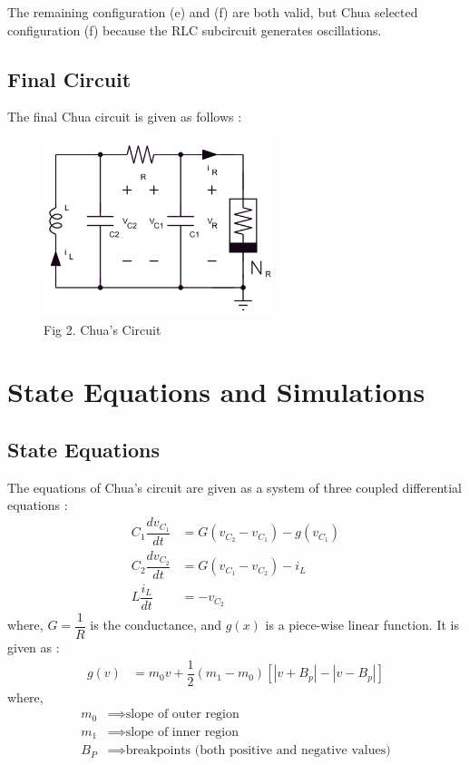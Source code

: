 \documentclass[12pt]{article}
\begin{document}
The remaining configuration (e) and (f) are both valid, but Chua selected configuration (f) because the RLC subcircuit generates oscillations.
%
\subsection{Final Circuit}
The final Chua circuit is given as follows :
\begin{figure}[H]
	\centering
	\includegraphics[width=0.6\textwidth]{Images/fig2_final.png}
	\caption{Fig 2. Chua's Circuit}
\end{figure}
%
\section{State Equations and Simulations}
\subsection{State Equations}
The equations of Chua's circuit are given as a system of three coupled differential equations :
\begin{align}
	C_1 \dfrac{dv_{C_1}}{dt}&=G\left( v_{C_2}-v_{C_1} \right)-g(v_{C_1}) \label{eq:1} \\
	C_2 \dfrac{dv_{C_2}}{dt}&=G\left( v_{C_1}-v_{C_2} \right)-i_L \label{eq:2}\\
	L \dfrac{i_L}{dt}&=-v_{C_2}\label{eq:3}
\end{align}
where, $G=\dfrac{1}{R}$ is the conductance, and $g(x)$ is a piece-wise linear function. It is given as :
\begin{align}
	g(v)&=m_0v+\dfrac{1}{2}(m_1-m_0)\left[ |v+B_p|-|v-B_p| \right] \label{eq:4}
\end{align}
where,
\begin{align*}
	m_0 &\implies \text{slope of outer region} \\
	m_1 &\implies \text{slope of inner region} \\
	B_P &\implies \text{breakpoints (both positive and negative values)}
\end{align*}
%
\end{document}
